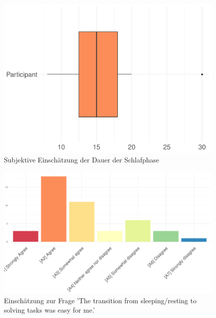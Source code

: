 \begin{figure}[H]
	\centering
	\includegraphics[width=\textwidth]{./_StudyResults/subjectiveSleepDuration}
	\caption{Subjektive Einschätzung der Dauer der Schlafphase}
	\label{fig:subjectiveSleepDuration}
\end{figure}

\begin{figure}[H]
	\centering
	\includegraphics[width=\textwidth]{./_StudyResults/transitionEasy}
	\caption{Einschätzung zur Frage 'The transition from sleeping/resting to solving tasks was easy for me.'}
	\label{fig:transitionEasy}
\end{figure}


